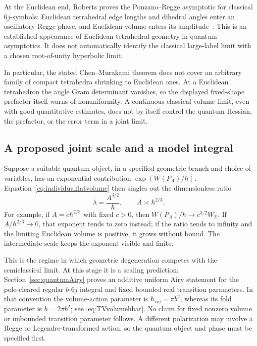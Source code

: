 At the Euclidean end, Roberts proves the Ponzano--Regge asymptotic
for classical $6j$-symbols: Euclidean tetrahedral edge lengths and
dihedral angles enter an oscillatory Regge phase, and Euclidean
volume enters its amplitude~\cite{Roberts}. This is an established
appearance of Euclidean tetrahedral geometry in quantum
asymptotics. It does not automatically identify the classical
large-label limit with a chosen root-of-unity hyperbolic limit.

In particular, the stated Chen--Murakami theorem does not cover
an arbitrary family of compact tetrahedra shrinking to Euclidean
ones. At a Euclidean tetrahedron the angle Gram determinant
vanishes, so the displayed fixed-shape prefactor itself warns of
nonuniformity. A continuous classical volume limit, even with
good quantitative estimates, does not by itself control the
quantum Hessian, the prefactor, or the error term in a joint limit.

\subsection{A proposed joint scale and a model integral}

Suppose a suitable quantum object, in a specified geometric branch
and choice of variables, has an exponential contribution
$\exp(W(P_A)/\hbar)$. Equation~\eqref{eq:individualflatvolume}
then singles out the dimensionless ratio
\begin{equation}
 \lambda=\frac{A^{3/2}}{\hbar},\qquad
 A\asymp\hbar^{2/3}.
 \label{eq:jointscale}
\end{equation}
For example, if $A=c\hbar^{2/3}$ with fixed $c>0$, then
$W(P_A)/\hbar\to c^{3/2}W_{\mathrm E}$.
If $A/\hbar^{2/3}\to0$, that exponent tends to zero instead;
if the ratio tends to infinity and the limiting Euclidean volume
is positive, it grows without bound. The intermediate scale
keeps the exponent visible and finite.

This is the regime in which geometric degeneration competes
with the semiclassical limit. At this stage it is a scaling prediction;
Section~\ref{sec:quantumAiry} proves an additive uniform Airy
statement for the pole-cleared regular $b$-$6j$ integral and fixed
bounded real transition parameters. In that convention the
volume-action parameter is $\hbar_{\mathrm{vol}}=\pi b^2$,
whereas its fold parameter is $h=2\pi b^2$; see
\eqref{eq:TVvolumehbar}. No claim for fixed nonzero volume or
unbounded transition parameter follows. A different
polarization may involve a Regge or Legendre-transformed action,
so the quantum object and phase must be specified first.

